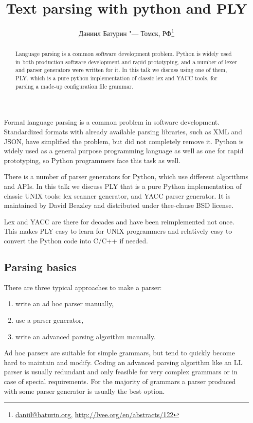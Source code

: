 \documentclass[10pt, a5paper]{article}
\begin{document}
\title{Text parsing with python and PLY}
\author{Даниил Батурин "--- Томск, РФ\footnote{\url{daniil@baturin.org}, \url{http://lvee.org/en/abstracts/122}}}
\maketitle
\begin{abstract}
Language parsing is a common software development problem. Python is widely used in both production software development and rapid prototyping, and a number of lexer and parser generators were written for it.
In this talk we discuss using one of them, PLY, which is a pure python implementation of classic lex and YACC tools, for parsing a made-up configuration file grammar.
\end{abstract}
Formal language parsing is a common problem in software development. Standardized formats with already available parsing libraries, such as XML and JSON, have simplified the problem, but did not completely remove it. Python is widely used as a general purpose programming language as well as one for rapid prototyping, so Python programmers face this task as well.

There is a number of parser generators for Python, which use different algorithms and APIs. In this talk we discuss PLY that is a pure Python implementation of classic UNIX tools: lex scanner generator, and YACC parser generator. It is maintained by David Beazley and distributed under thee-clause BSD license.

Lex and YACC are there for decades and have been reimplemented not once. This makes PLY easy to learn for UNIX programmers and relatively easy to convert the Python code into C/C++ if needed.

\subsection*{Parsing basics}

There are three typical approaches to make a parser:

\begin{enumerate}
  \item write an ad hoc parser manually,
  \item use a parser generator,
  \item write an advanced parsing algorithm manually.
\end{enumerate}

Ad hoc parsers are suitable for simple grammars, but tend to quickly become hard to maintain and modify. Coding an advanced parsing algorithm like an LL parser is usually redundant and only feasible for very complex grammars or in case of special requirements. For the majority of grammars a parser produced with some parser generator is usually the best option.
\end{document}

